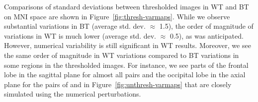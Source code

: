 \documentclass[conference]{IEEEtran}
\begin{document}
  \begin{figure}[b]
  \end{figure}

Comparisons of standard deviations between thresholded images in WT and BT
on MNI space are shown in Figure~\ref{fig:thresh-varmaps}.
While we observe substantial variations in BT (average std. dev. $\approx$ 1.5),
the order of magnitude of variations in WT is much lower (average std. dev. $\approx$ 0.5),
as was anticipated. However, numerical variability is still significant in WT results.
Moreover, we see the same order of magnitude in WT variations compared to BT variations
in some regions in the thresholded images.
For instance, we see parts of the frontal lobe in the sagittal plane for almost all pairs and the occipital lobe in the axial plane
for the pairs of \fslspm and \fslafni in Figure~\ref{fig:unthresh-varmaps}
that are closely simulated using the numerical perturbations. 
\end{document}
